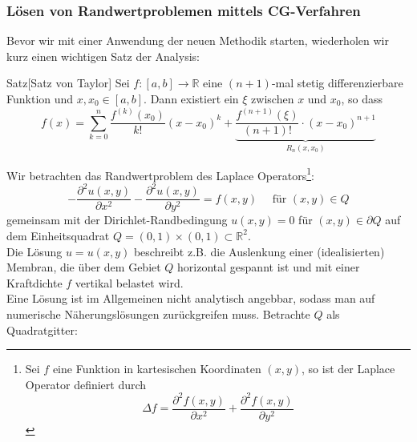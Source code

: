 \documentclass{article}
\begin{document}
    \subsubsection{Lösen von Randwertproblemen mittels CG-Verfahren}
    Bevor wir mit einer Anwendung der neuen Methodik starten, wiederholen wir kurz einen wichtigen Satz der Analysis:
    \begin{thmbox}{Satz}[Satz von Taylor]
        Sei $f:[a,b]\rightarrow \mathbb{R}$ eine $(n+1)$-mal stetig differenzierbare Funktion und $x,x_0\in[a,b]$. 
        Dann existiert ein $\xi$ zwischen $x$ und $x_0$, so dass
        \[f(x) = \sum_{k=0}^{n}\dfrac{f^{(k)}(x_0)}{k!}(x-x_0)^k + 
        \underbrace{\dfrac{f^{(n+1)}(\xi)}{(n+1)!}\cdot(x-x_0)^{n+1}}_{R_n(x,x_0)}\]
    \end{thmbox}
    \begin{egbox}
        Wir betrachten das Randwertproblem des Laplace Operators\footnote{
            Sei $f$ eine Funktion in kartesischen Koordinaten $(x,y)$, so ist der Laplace Operator definiert durch 
            \[\Delta f = \dfrac{\partial^2 f(x,y)}{\partial x^2} + \dfrac{\partial^2 f(x,y)}{\partial y^2}\]
            }:
        \[-\dfrac{\partial^2 u(x,y)}{\partial x^2} - \dfrac{\partial^2 u(x,y)}{\partial y^2} = f(x,y) \quad 
        \text{ für } (x,y)\in Q\]
        gemeinsam mit der Dirichlet-Randbedingung $u(x,y)=0$ für $(x,y)\in \partial Q$ auf dem Einheitsquadrat 
        $Q=(0,1)\times(0,1)\subset\mathbb{R}^2$. \\
        Die Lösung $u=u(x,y)$ beschreibt z.B. die Auslenkung einer (idealisierten) Membran, die über dem Gebiet $Q$ 
        horizontal gespannt ist und mit einer Kraftdichte $f$ vertikal belastet wird. \\
        Eine Lösung ist im Allgemeinen nicht analytisch angebbar, sodass man auf numerische Näherungslösungen 
        zurückgreifen muss.
        Betrachte $Q$ als Quadratgitter: 
        \begin{center}
\end{center}
\end{egbox}
\end{document}
